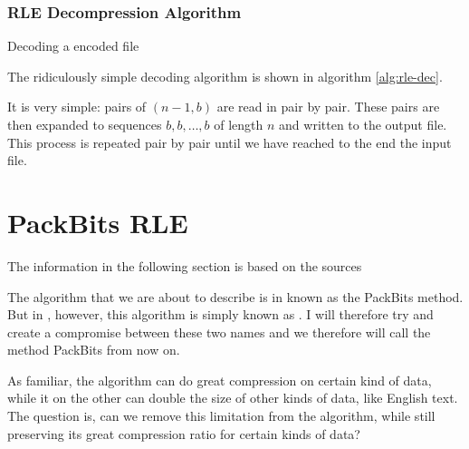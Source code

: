 \subsubsection{RLE Decompression Algorithm}

\begin{algorithm}
  \caption{Decoding a \rle encoded file}
  \label{alg:rle-dec}
  \begin{algorithmic}[1]


    \While{\neof}
    \State {}
    \EndRepeatn


    \EndWhile
  \end{algorithmic}
\end{algorithm}

The ridiculously simple \rle decoding algorithm is shown in algorithm
\ref{alg:rle-dec}.

It is very simple: pairs of $(n-1,b)$ are read in pair by pair. These
pairs are then expanded to sequences $b,b,\dots,b$ of length $n$ and
written to the output file. This process is repeated pair by pair
until we have reached to the end the input file.

\section{PackBits RLE}
\label{sec:packbits-rle}

The information in the following section is based on the sources
\cite{96:_techn_note_tn102,apple1994inside,91:_truev_tga_file_format_specif}

The algorithm that we are about to describe is in
\cite{96:_techn_note_tn102,apple1994inside} known as the PackBits
method. But in \cite{91:_truev_tga_file_format_specif}, however, this
algorithm is simply known as \rle. I will therefore try and create a
compromise between these two names and we therefore will call the
method PackBits \rle from now on.

As familiar, the \rle algorithm can do great compression on certain
kind of data, while it on the other can double the size of other kinds
of data, like English text. The question is, can we remove this
limitation from the algorithm, while still preserving its great
compression ratio for certain kinds of data?

